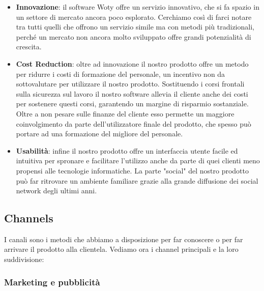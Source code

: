 \begin{itemize}
\item \textbf{Innovazione}: il software Woty offre un servizio innovativo, che si fa spazio in un settore di mercato ancora poco esplorato. Cerchiamo così di farci notare tra tutti quelli che offrono un servizio simile ma con metodi più tradizionali, perché un mercato non ancora molto sviluppato offre grandi potenzialità di crescita.
\item \textbf{Cost Reduction}: oltre ad innovazione il nostro prodotto offre un metodo per ridurre i costi di formazione del personale, un incentivo non da sottovalutare per utilizzare il nostro prodotto. Sostituendo i corsi frontali sulla sicurezza sul lavoro il nostro software allevia il cliente anche dei costi per sostenere questi corsi, garantendo un margine di risparmio sostanziale. Oltre a non pesare sulle finanze del cliente esso permette un maggiore coinvolgimento da parte dell'utilizzatore finale del prodotto, che spesso può portare ad una formazione del migliore del personale.
\item \textbf{Usabilità}: infine il nostro prodotto offre un interfaccia utente facile ed intuitiva per spronare e facilitare l'utilizzo anche da parte di quei clienti meno propensi alle tecnologie informatiche. La parte "social" del nostro prodotto può far ritrovare un ambiente familiare grazie alla grande diffusione dei social network degli ultimi anni.
\end{itemize}

\subsection{Channels}

I canali sono i metodi che abbiamo a disposizione per far conoscere o per far arrivare il prodotto alla clientela. Vediamo ora i channel principali e la loro suddivisione:

\subsubsection{Marketing e pubblicità}

